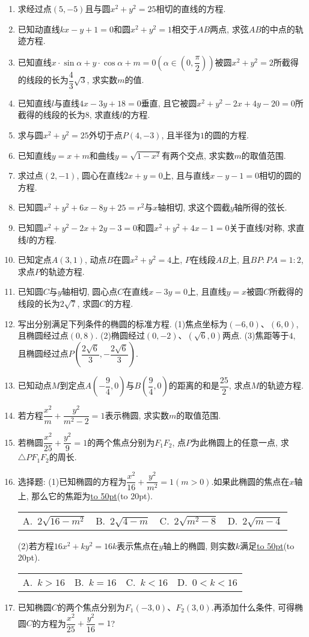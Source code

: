 \documentclass[10pt,a4paper]{article}
\newcommand{\blank}[1]{\underline{\hbox to #1pt{}}}
\newcommand{\bracket}[1]{(\hbox to #1pt{})}
\newcommand{\fourch}[4]{\par\begin{tabular}{p{.23\textwidth}p{.23\textwidth}p{.23\textwidth}p{.23\textwidth}}
A.~#1 &B.~#2& C.~#3& D.~#4
\end{tabular}}
\begin{document}
\begin{enumerate}[1.]
\item 求经过点$(5,-5)$且与圆$x^2+y^2=25$相切的直线的方程.
\item 已知动直线$kx-y+1=0$和圆$x^2+y^2=1$相交于$AB$两点, 求弦$AB$的中点的轨迹方程.
\item 已知直线$x\cdot \sin \alpha +y\cdot \cos \alpha +m=0(\alpha \in (0,\dfrac{\pi }2))$被圆$x^2+y^2=2$所截得的线段的长为$\dfrac 43\sqrt 3$, 求实数$m$的值.
\item 已知直线$l$与直线$4x-3y+18=0$垂直, 且它被圆$x^2+y^2-2x+4y-20=0$所截得的线段的长为$8$, 求直线$l$的方程.
\item 求与圆$x^2+y^2=25$外切于点$P(4,-3)$, 且半径为$1$的圆的方程.
\item 已知直线$y=x+m$和曲线$y=\sqrt {1-x^2}$有两个交点, 求实数$m$的取值范围.
\item 求过点$(2,-1)$, 圆心在直线$2x+y=0$上, 且与直线$x-y-1=0$相切的圆的方程.
\item 已知圆$x^2+y^2+6x-8y+25=r^2$与$x$轴相切, 求这个圆截$y$轴所得的弦长.
\item 已知圆$x^2+y^2-2x+2y-3=0$和圆$x^2+y^2+4x-1=0$关于直线$l$对称, 求直线$l$的方程.
\item 已知定点$A(3,1)$, 动点$B$在圆$x^2+y^2=4$上, $P$在线段$AB$上, 且$BP:PA=1:2$, 求点$P$的轨迹方程.
\item 已知圆$C$与$y$轴相切, 圆心点$C$在直线$x-3y=0$上, 且直线$y=x$被圆$C$所截得的线段的长为$2\sqrt 7$, 求圆$C$的方程.
\item 写出分别满足下列条件的椭圆的标准方程.
(1)焦点坐标为$(-6,0)$、$(6,0)$, 且椭圆经过点$(0,8)$.
(2)椭圆经过$(0,-2)$、$(\sqrt 6,0)$两点.
(3)焦距等于$4$, 且椭圆经过点$P(\dfrac{2\sqrt 6}3,-\dfrac{2\sqrt 6}3)$.
\item 已知动点$M$到定点$A(-\dfrac 94,0)$与$B(\dfrac 94,0)$的距离的和是$\dfrac{25}2$, 求点$M$的轨迹方程.
\item 若方程$\dfrac{x^2}m+\dfrac{y^2}{{m^2}-2}=1$表示椭圆, 求实数$m$的取值范围.
\item 若椭圆$\dfrac{x^2}{25}+\dfrac{y^2}9=1$的两个焦点分别为$F_1F_2$, 点$P$为此椭圆上的任意一点, 求$\triangle PF_1F_2$的周长.
\item 选择题:
(1)已知椭圆的方程为$\dfrac{x^2}{16}+\dfrac{y^2}{m^2}=1(m>0)$.如果此椭圆的焦点在$x$轴上, 那么它的焦距为\blank{50}\bracket{20}.
\fourch{$2\sqrt {16-m^2}$}{$2\sqrt {4-m}$}{$2\sqrt {m^2-8}$}{$2\sqrt {m-4}$}
(2)若方程$16x^2+ky^2=16k$表示焦点在$y$轴上的椭圆, 则实数$k$满足\blank{50}\bracket{20}.
\fourch{$k>16$}{$k=16$}{$k<16$}{$0<k<16$}
\item 已知椭圆$C$的两个焦点分别为$F_1(-3,0)$、$F_2(3,0)$.再添加什么条件, 可得椭圆$C$的方程为$\dfrac{x^2}{25}+\dfrac{y^2}{16}=1$?

\end{enumerate}
\end{document}
